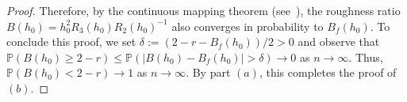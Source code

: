 \begin{proof}
    Therefore, by the continuous mapping theorem (see~\cite[Theorem~2.3]{Vaart_1998}), the roughness ratio $B(h_0)=h_0^2R_3(h_0)R_2(h_0)^{-1}$ also converges in probability to $B_f(h_0)$. To conclude this proof, we set $\delta:=(2-r-B_f(h_0))/2>0$ and observe that $\mathbb{P}(B(h_0)\ge2-r)\le\mathbb{P}(|B(h_0)-B_f(h_0)|>\delta)\to 0$ as $n\to\infty$. Thus, $\mathbb{P}(B(h_0)<2-r)\to1$ as $n\to\infty$. By part $(a)$, this completes the proof of $(b)$.
\end{proof}
